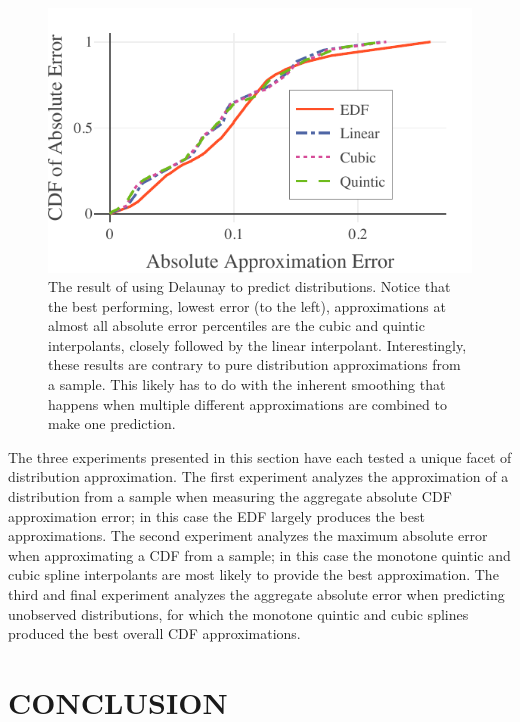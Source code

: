 \documentclass[letterpaper, 10 pt, conference]{IEEEtran}  %
\begin{document}
\begin{figure}
  \vspace{-.3cm}
  \includegraphics[width=.5\textwidth]{delaunay-predictions.pdf}
  \caption{The result of using Delaunay to predict distributions. Notice that the best performing, lowest error (to the left), approximations at almost all absolute error percentiles are the cubic and quintic interpolants, closely followed by the linear interpolant. Interestingly, these results are contrary to pure distribution approximations from a sample. This likely has to do with the inherent smoothing that happens when multiple different approximations are combined to make one prediction.
  \vspace{-.5cm}}
  \label{fig:delaunay-errors}
\end{figure}


The three experiments presented in this section have each tested a unique facet of distribution approximation. The first experiment analyzes the approximation of a distribution from a sample when measuring the aggregate absolute CDF approximation error; in this case the EDF largely produces the best approximations. The second experiment analyzes the maximum absolute error when approximating a CDF from a sample; in this case the monotone quintic and cubic spline interpolants are most likely to provide the best approximation. The third and final experiment analyzes the aggregate absolute error when predicting unobserved distributions, for which the monotone quintic and cubic splines produced the best overall CDF approximations.




\section{CONCLUSION}
\label{sec:conclusion}
\end{document}
